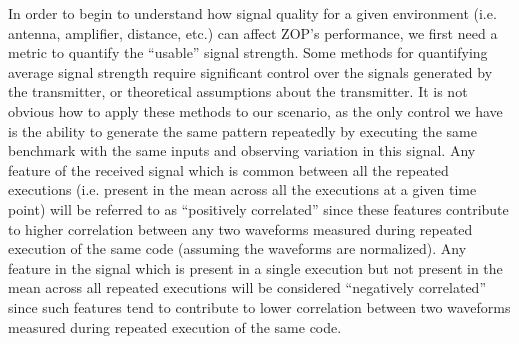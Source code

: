 
In order to begin to understand how signal quality for a given environment (i.e. antenna, amplifier, distance, etc.) can affect ZOP's performance, we first need a metric to quantify the ``usable'' signal strength. Some methods for quantifying average signal strength require significant control over the signals generated by the transmitter, or theoretical assumptions about the transmitter. It is not obvious how to apply these methods to our scenario, as the only control we have is the ability to generate the same pattern repeatedly by executing the same benchmark with the same inputs and observing variation in this signal. Any feature of the received signal which is common between all the repeated executions (i.e. present in the mean across all the executions at a given time point) will be referred to as ``positively correlated'' since these features contribute to higher correlation between any two waveforms measured during repeated execution of the same code (assuming the waveforms are normalized). Any feature in the signal which is present in a single execution but not present in the mean across all repeated executions will be considered ``negatively correlated'' since such features tend to contribute to lower correlation between two waveforms measured during repeated execution of the same code.

